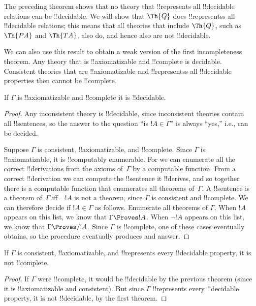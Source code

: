 \documentclass[../../../include/open-logic-section]{subfiles}
\begin{document}
\begin{explain}
The preceding theorem shows that no theory that !!{represents} all
!!{decidable} relations can be !!{decidable}. We will show that
$\Th{Q}$ does !!{represents}s all !!{decidable} relations; this means
that all theories that include $\Th{Q}$, such as $\Th{PA}$ and
$\Th{TA}$, also do, and hence also are not !!{decidable}.

We can also use this result to obtain a weak version of the first
incompleteness theorem.  Any theory that is !!{axiomatizable} and
!!{complete} is decidable.  Consistent theories that are
!!{axiomatizable} and !!{represents}s all !!{decidable} properties
then cannot be !!{complete}.
\end{explain}

\begin{thm}
If $\Gamma$ is !!{axiomatizable} and !!{complete} it is !!{decidable}.
\end{thm}

\begin{proof}
Any inconsistent theory is !!{decidable}, since inconsistent theories
contain all !!{sentence}s, so the answer to the question ``is $!A \in
\Gamma$'' is always ``yes,'' i.e., can be decided.

Suppose $\Gamma$ is consistent, !!{axiomatizable}, and
!!{complete}. Since $\Gamma$ is !!{axiomatizable}, it is !!{computably
enumerable}. For we can enumerate all the correct !!{derivation}s from
the axioms of~$\Gamma$ by a computable function. From a correct
!!{derivation} we can compute the !!{sentence} it !!{derive}s, and so
together there is a computable function that enumerates all theorems
of~$\Gamma$.  A !!{sentence} is a theorem of~$\Gamma$ iff $\lnot !A$
is not a theorem, since $\Gamma$ is consistent and !!{complete}.  We
can therefore decide if $!A \in \Gamma$ as follows. Enumerate all
theorems of $\Gamma$. When $!A$ appears on this list, we know that
$\Gamma \Proves !A$. When $\lnot !A$ appears on this list, we know
that $\Gamma \Proves/ !A$.  Since $\Gamma$ is !!{complete}, one of
these cases eventually obtains, so the procedure eventually produces
and answer.
\end{proof}

\begin{cor}
If $\Gamma$ is consistent, !!{axiomatizable}, and !!{represents} every
!!{decidable} property, it is not !!{complete}.
\end{cor}

\begin{proof}
If $\Gamma$ were !!{complete}, it would be !!{decidable} by the
previous theorem (since it is !!{axiomatizable} and consistent). But
since $\Gamma$ !!{represents} every !!{decidable} property, it is not
!!{decidable}, by the first theorem.
\end{proof}
\end{document}

